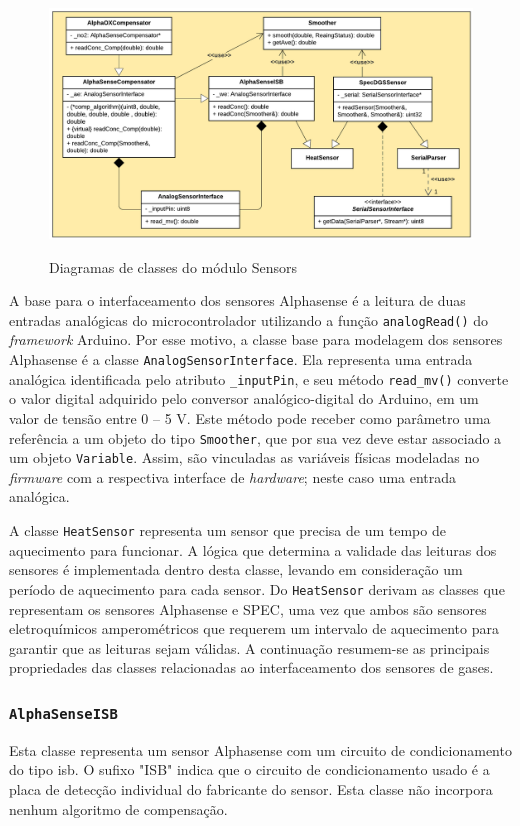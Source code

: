 \begin{figure}[h]
    \centering
    \caption{Diagramas de classes do módulo Sensors}
    \includegraphics[width=0.90\linewidth]{chapters//2-CLEAN/Figuras/Diagrama-de-classes-Sensors-Package.png}
    \label{fig:fw-libraries-sensors}
\end{figure}

A base para o interfaceamento dos sensores Alphasense é a leitura de duas entradas analógicas do microcontrolador utilizando a função \texttt{analogRead()} do \textit{framework} Arduino. Por esse motivo, a classe base para modelagem dos sensores Alphasense é a classe \texttt{AnalogSensorInterface}. Ela representa uma entrada analógica identificada pelo atributo \texttt{\_inputPin}, e seu método \texttt{read\_mv()} converte o valor digital adquirido pelo conversor analógico-digital do Arduino, em um valor de tensão entre 0 – 5 V. Este método pode receber como parâmetro uma referência a um objeto do tipo \texttt{Smoother}, que por sua vez deve estar associado a um objeto \texttt{Variable}. Assim, são vinculadas as variáveis físicas modeladas no \textit{firmware} com a respectiva interface de \textit{hardware}; neste caso uma entrada analógica.

A classe \texttt{HeatSensor} representa um sensor que precisa de um tempo de aquecimento para funcionar. A lógica que determina a validade das leituras dos sensores é implementada dentro desta classe, levando em consideração um período de aquecimento para cada sensor. Do \texttt{HeatSensor} derivam as classes que representam os sensores Alphasense e SPEC, uma vez que ambos são sensores eletroquímicos amperométricos que requerem um intervalo de aquecimento para garantir que as leituras sejam válidas. A continuação resumem-se as principais propriedades das classes relacionadas ao interfaceamento dos sensores de gases.

\subsubsection{\texttt{AlphaSenseISB}}
Esta classe representa um sensor Alphasense com um circuito de condicionamento do tipo \acrshort{isb}. O sufixo "ISB" indica que o circuito de condicionamento usado é a placa de detecção individual do fabricante do sensor. Esta classe não incorpora nenhum algoritmo de compensação.


